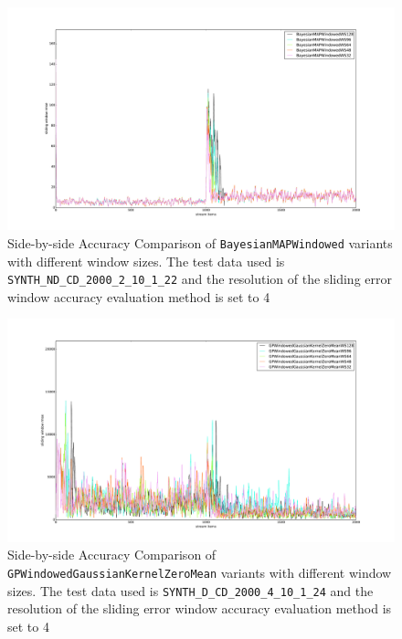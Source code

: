 \begin{figure}[htbp]
  \centering
    \includegraphics[width=\linewidth]{./Figures/wsize_on_stabilization_sidebyside_comp_res4.pdf}
  \caption{Side-by-side Accuracy Comparison of \texttt{BayesianMAPWindowed} variants with different window sizes. The test data used is \texttt{SYNTH\_ND\_CD\_2000\_2\_10\_1\_22} and the resolution of the sliding error window accuracy evaluation method is set to 4}
  \label{fig:wsize_on_stabilization_sidebyside_comp_res4}
\end{figure}

\begin{figure}[htbp]
  \centering
    \includegraphics[width=\linewidth]{./Figures/wsize_on_stabilization2_sidebyside_comp_res4.pdf}
  \caption{Side-by-side Accuracy Comparison of \texttt{GPWindowedGaussianKernelZeroMean} variants with different window sizes. The test data used is \texttt{SYNTH\_D\_CD\_2000\_4\_10\_1\_24} and the resolution of the sliding error window accuracy evaluation method is set to 4}
  \label{fig:wsize_on_stabilization2_sidebyside_comp_res4}
\end{figure}

